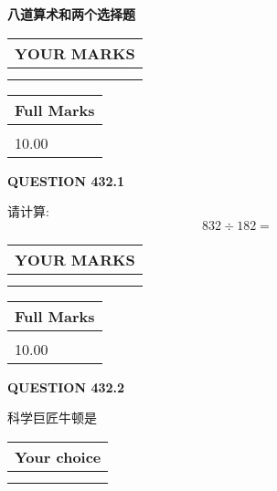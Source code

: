 \documentclass{ctexart}
\begin{document}
   
 \vspace{0.2in}
{\LARGE {\textbf{ 八道算术和两个选择题}}}
   
   
  
\vspace{0.2in}
  
\noindent\begin{tabular}{|l|}
\hline
 YOUR MARKS  \\
\hline
 \\ 
 \\ 
\hline
\end{tabular}
\hspace{0.05in} \begin{tabular}{|l|}
\hline
 Full Marks  \\
\hline
 \\ 
10.00 \\
\hline
\end{tabular}
{\textbf{\Large{QUESTION
432.1 
}}}
  
  
 
请计算:
\begin{equation}
832  \div    %
182 = \nonumber
\end{equation}
 

 

 
  
\vspace{0.2in}
  
\noindent\begin{tabular}{|l|}
\hline
 YOUR MARKS  \\
\hline
 \\ 
 \\ 
\hline
\end{tabular}
\hspace{0.05in} \begin{tabular}{|l|}
\hline
 Full Marks  \\
\hline
 \\ 
10.00 \\
\hline
\end{tabular}
{\textbf{\Large{QUESTION
432.2 
}}}
  
  
科学巨匠牛顿是
  
  
\noindent\hspace{3.0in} \begin{tabular}{|l|}
\hline
Your choice \\
\hline
 \\ 
 \\ 
\hline
\end{tabular}
  
  
 
\end{document}
